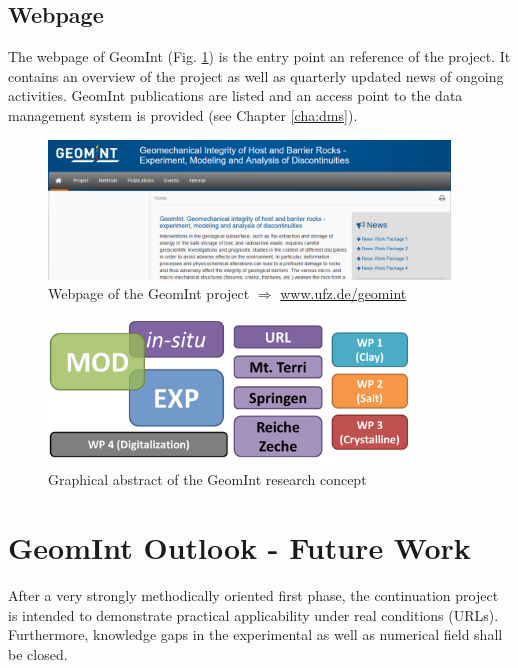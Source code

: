 \subsection*{Webpage}

The webpage of GeomInt (Fig. \ref{fig:geomint-web}) is the entry point an reference of the project. It contains an overview of the project as well as quarterly updated news of ongoing activities. GeomInt publications are listed and an access point to the data management system is provided (see Chapter \ref{cha:dms}).

\begin{figure}[ht!]
\centering
\includegraphics[width=0.95\textwidth]{figures/geomint-web.png}
\caption{Webpage of the GeomInt project $\Rightarrow$ \url{www.ufz.de/geomint}}
\label{fig:geomint-web}
\end{figure}

\begin{figure}[ht!]
\centering
\includegraphics[width=0.85\textwidth]{figures/geomint2.png}
\caption{Graphical abstract of the GeomInt research concept}
\label{fig:geomint2}
\end{figure}

\section{GeomInt Outlook - Future Work}

After a very strongly methodically oriented first phase, the continuation project is intended to demonstrate practical applicability under real conditions (URLs). Furthermore, knowledge gaps in the experimental as well as numerical field shall be closed.

